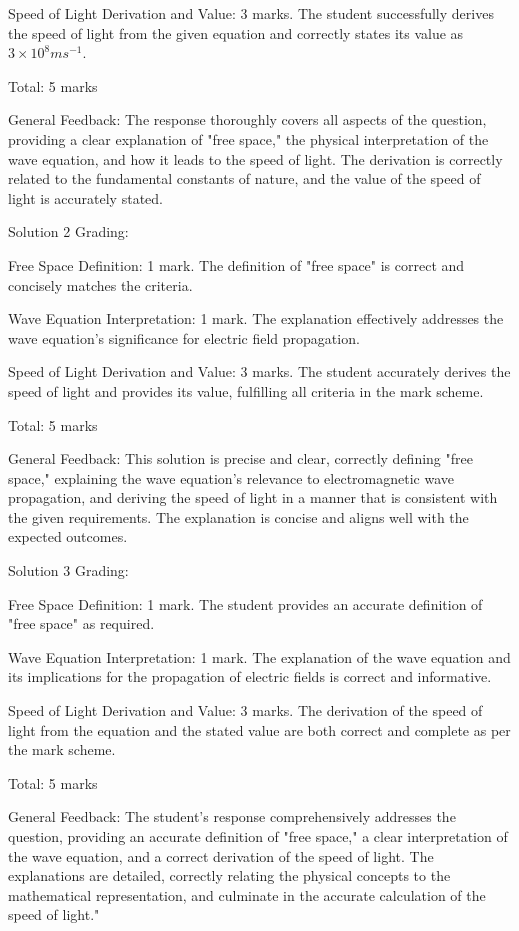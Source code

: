 \documentclass[a4paper,11pt]{article}
\begin{document}
Speed of Light Derivation and Value: 3 marks. The student successfully derives the speed of light from the given equation and correctly states its value as \( 3 \times 10^8 ms^{-1}\).

Total: 5 marks

General Feedback: The response thoroughly covers all aspects of the question, providing a clear explanation of "free space," the physical interpretation of the wave equation, and how it leads to the speed of light. The derivation is correctly related to the fundamental constants of nature, and the value of the speed of light is accurately stated.

Solution 2 Grading:

Free Space Definition: 1 mark. The definition of "free space" is correct and concisely matches the criteria.

Wave Equation Interpretation: 1 mark. The explanation effectively addresses the wave equation's significance for electric field propagation.

Speed of Light Derivation and Value: 3 marks. The student accurately derives the speed of light and provides its value, fulfilling all criteria in the mark scheme.

Total: 5 marks

General Feedback: This solution is precise and clear, correctly defining "free space," explaining the wave equation's relevance to electromagnetic wave propagation, and deriving the speed of light in a manner that is consistent with the given requirements. The explanation is concise and aligns well with the expected outcomes.

Solution 3 Grading:

Free Space Definition: 1 mark. The student provides an accurate definition of "free space" as required.

Wave Equation Interpretation: 1 mark. The explanation of the wave equation and its implications for the propagation of electric fields is correct and informative.

Speed of Light Derivation and Value: 3 marks. The derivation of the speed of light from the equation and the stated value are both correct and complete as per the mark scheme.

Total: 5 marks

General Feedback: The student's response comprehensively addresses the question, providing an accurate definition of "free space," a clear interpretation of the wave equation, and a correct derivation of the speed of light. The explanations are detailed, correctly relating the physical concepts to the mathematical representation, and culminate in the accurate calculation of the speed of light."
\end{document}
